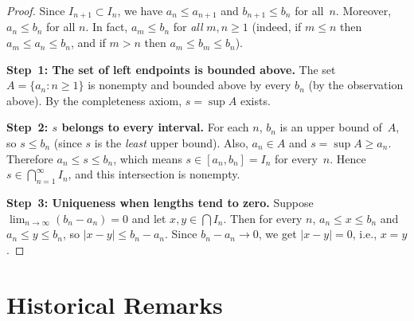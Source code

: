 \documentclass[12pt,a4paper,openany]{book}
\newcommand{\abs}[1]{\left\lvert #1 \right\rvert}
\theoremstyle{definition}
\theoremstyle{remark}
\begin{document}
\begin{center}
\end{center}

\begin{proof}
Since $I_{n+1} \subset I_n$, we have $a_n \leq a_{n+1}$ and
$b_{n+1} \leq b_n$ for all~$n$.  Moreover, $a_n \leq b_n$ for all $n$.  In
fact, $a_m \leq b_n$ for \emph{all} $m,n \geq 1$ (indeed, if $m \leq n$
then $a_m \leq a_n \leq b_n$, and if $m > n$ then $a_m \leq b_m \leq b_n$).

\textbf{Step~1: The set of left endpoints is bounded above.}\quad
The set $A = \{a_n : n \geq 1\}$ is nonempty and bounded above by every
$b_n$ (by the observation above).  By the completeness axiom, $s = \sup A$
exists.

\textbf{Step~2: $s$ belongs to every interval.}\quad
For each $n$, $b_n$ is an upper bound of~$A$, so $s \leq b_n$ (since $s$
is the \emph{least} upper bound).  Also, $a_n \in A$ and $s = \sup A \geq
a_n$.  Therefore $a_n \leq s \leq b_n$, which means $s \in [a_n, b_n] =
I_n$ for every~$n$.  Hence $s \in \bigcap_{n=1}^{\infty} I_n$, and this
intersection is nonempty.

\textbf{Step~3: Uniqueness when lengths tend to zero.}\quad
Suppose $\lim_{n\to\infty}(b_n-a_n)=0$ and let $x,y \in \bigcap I_n$.
Then for every $n$, $a_n \leq x \leq b_n$ and $a_n \leq y \leq b_n$, so
$\abs{x-y} \leq b_n - a_n$.  Since $b_n - a_n \to 0$, we get
$\abs{x-y}=0$, i.e., $x=y$.
\end{proof}

\section{Historical Remarks}
\label{sec:historical-reals}
\end{document}
